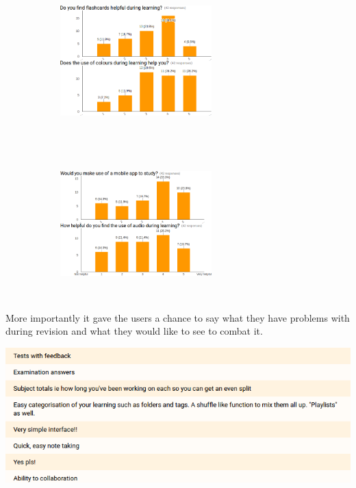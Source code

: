 \documentclass{article}
\begin{document}
\begin{figure}[ht]
	\centering
	\begin{subfigure}{}
	  \centering
			\includegraphics[width=5.85cm, height=5.8cm]{images_colours.png}
	\end{subfigure}%
	\begin{subfigure}{}
	  \centering
			\includegraphics[width=5.85cm, height=5.8cm]{mobile_audio.png}
	\end{subfigure}
\end{figure}

\newpage
More importantly it gave the users a chance to say what they have problems with during revision and what they would like to see to combat it.

\begin{center}
	\vspace{1mm}
	\includegraphics[scale=0.5]{feedback.png}
	\vspace{1mm}
\end{center}
\end{document}
